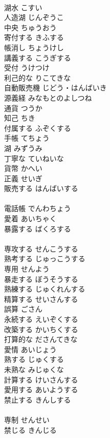\documentclass[8pt]{extreport}
\begin{document}
\begin{CJK}{UTF8}{min}
\\	湖水	こすい	
\\	人造湖	じんぞうこ	
\\	中央	ちゅうおう	
\\	寄付する	きふする	
\\	帳消し	ちょうけし	
\\	講義する	こうぎする	
\\	受付	うけつけ	
\\	利己的な	りこてきな	
\\	自動販売機	じどう・はんばいき	
\\	源義経	みなもとのよしつね	
\\	通貨	つうか	
\\	知己	ちき	
\\	付属する	ふぞくする	
\\	手帳	てちょう	
\\	湖	みずうみ	
\\	丁寧な	ていねいな	
\\	貨幣	かへい	
\\	正義	せいぎ	
\\	販売する	はんばいする	
\\	[漢語]
\\	電話帳	でんわちょう	
\\	愛着	あいちゃく	
\\	暴露する	ばくろする	
\\	[漢語]
\\	専攻する	せんこうする	
\\	熟考する	じゅっこうする	
\\	専用	せんよう	
\\	暴走する	ぼうそうする	
\\	熟練する	じゅくれんする	
\\	精算する	せいさんする	
\\	誤算	ごさん	
\\	永続する	えいぞくする	
\\	改築する	かいちくする	
\\	打算的な	ださんてきな	
\\	愛情	あいじょう	
\\	熟する	じゅくする	
\\	未熟な	みじゅくな	
\\	計算する	けいさんする	
\\	愛用する	あいようする	
\\	禁止する	きんしする	
\\	[漢語]
\\	専制	せんせい	
\\	禁じる	きんじる	

\end{CJK}
\end{document}
